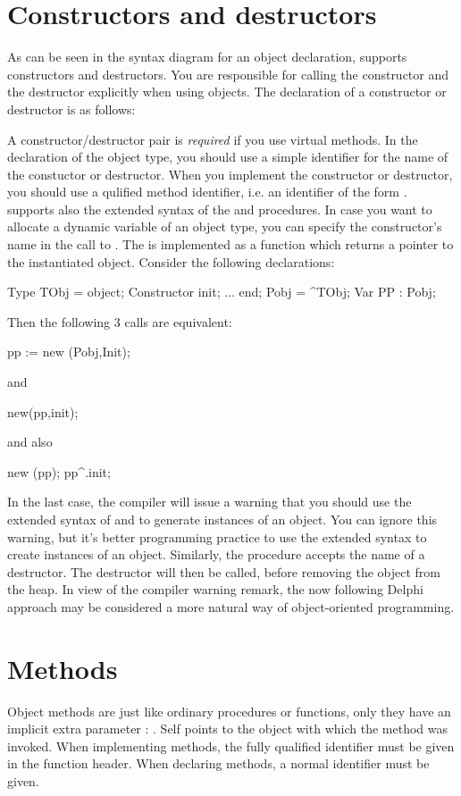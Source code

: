 \documentclass{report}
\begin{document}
\section{Constructors and destructors }
\label{se:constructdestruct}
As can be seen in the syntax diagram for an object declaration, \fpc supports
constructors and destructors. You are responsible for calling the 
constructor and the destructor explicitly when using objects.
The declaration of a constructor or destructor is as follows:

A constructor/destructor pair is {\em required} if you use virtual methods.
In the declaration of the object type, you should use a simple identifier
for the name of the constuctor or destructor. When you implement the
constructor or destructor, you should use a qulified method identifier,
i.e. an identifier of the form .
\fpc supports also the extended syntax of the  and 
procedures. In case you want to allocate a dynamic variable of an object
type, you can specify the constructor's name in the call to .
The  is implemented as a function which returns a pointer to the
instantiated object. Consider the following declarations:
\begin{listing}
Type
  TObj = object;
   Constructor init;
   ...
   end;
  Pobj = ^TObj;
Var PP : Pobj;
\end{listing}
Then the following 3 calls are equivalent:
\begin{listing}
 pp := new (Pobj,Init);
\end{listing}
and
\begin{listing}
  new(pp,init);
\end{listing}
and also
\begin{listing}
  new (pp);
  pp^.init;
\end{listing}
In the last case, the compiler will issue a warning that you should use the
extended syntax of  and  to generate instances of an
object. You can ignore this warning, but it's better programming practice to
use the extended syntax to create instances of an object.
Similarly, the  procedure accepts the name of a destructor. The
destructor will then be called, before removing the object from the heap.
In view of the compiler warning remark, the now following Delphi approach may 
be considered a more natural way of object-oriented programming.
\section{Methods}
Object methods are just like ordinary procedures or functions, only they
have an implicit extra parameter : . Self points to the object
with which the method was invoked.
When implementing methods, the fully qualified identifier must be given
in the function header. When declaring methods, a normal identifier must be
given. 
\end{document}
